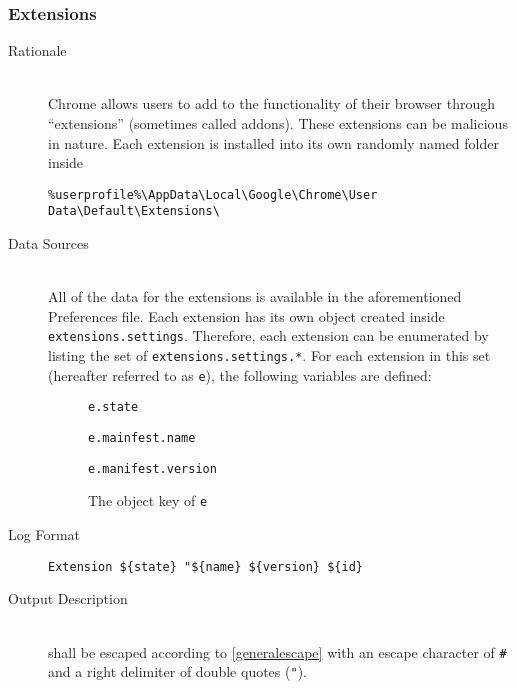 \subsubsection{Extensions}
\begin{description}
\item[Rationale] \hfill \\
Chrome allows users to add to the functionality of their browser through
``extensions'' (sometimes called addons).  These extensions can be malicious in
nature.   Each extension is installed into its own randomly named folder inside
\vspace{-\baselineskip}
\begin{verbatim}
%userprofile%\AppData\Local\Google\Chrome\User Data\Default\Extensions\
\end{verbatim}
\item[Data Sources] \hfill \\
All of the data for the extensions is available in the aforementioned
Preferences file.  Each extension has its own object created inside
\texttt{extensions.settings}.  Therefore, each extension can be enumerated by
listing the set of \texttt{extensions.settings.*}.  For each extension in this
set (hereafter referred to as \texttt{e}), the following variables are defined:
\begin{description}
\item[] \texttt{e.state}
\item[] \texttt{e.mainfest.name}
\item[] \texttt{e.manifest.version}
\item[] The object key of \texttt{e}
\end{description}
\item[Log Format] \hfill 
\vspace{-\baselineskip}
\begin{verbatim}
Extension ${state} "${name} ${version} ${id}
\end{verbatim}
\item[Output Description] \hfill \\
 shall be escaped according to \ref{generalescape} with an escape
character of \verb|#| and a right delimiter of double quotes (\verb|"|). 


\end{description}
